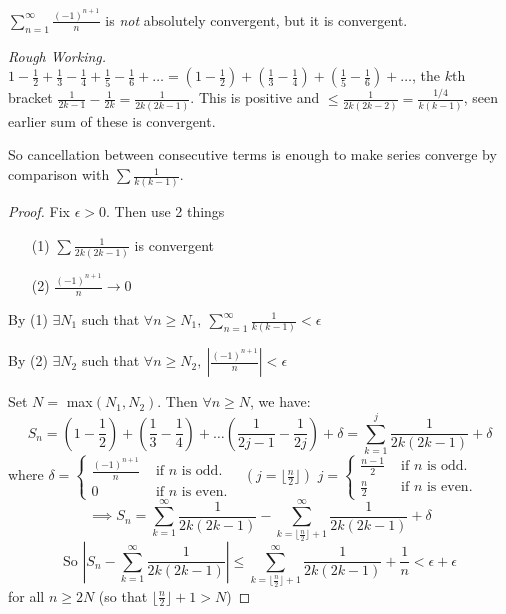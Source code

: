 \begin{example}
$\sum_{n=1}^{\infty} \frac{(-1)^{n+1}}{n}$ is \emph{not} absolutely convergent, but it is convergent.


\textit{Rough Working.} $1 - \frac{1}{2} + \frac{1}{3} - \frac{1}{4} + \frac{1}{5} - \frac{1}{6} + \dots = (1-\frac{1}{2}) + (\frac{1}{3} - \frac{1}{4}) + (\frac{1}{5} -\frac{1}{6}) + \dots$, the $k$th bracket $\frac{1}{2k-1} - \frac{1}{2k} = \frac{1}{2k(2k-1)}$. This is positive and $\leq \frac{1}{2k(2k-2)} = \frac{1/4}{k(k-1)}$, seen earlier sum of these is convergent.

So cancellation between consecutive terms is enough to make series converge by comparison with $\sum \frac{1}{k(k-1)}$.

\begin{proof}
Fix $\epsilon >0.$ Then use 2 things\begin{enumerate}
\item[(1)] $\sum \frac{1}{2k(2k-1)}$	is convergent
\item[(2)] $\frac{(-1)^{n+1}}{n}\to 0$
\end{enumerate}
By (1) $\exists N_1$ such that $\forall n \geq N_1,~ \sum_{n=1}^{\infty} \frac{1}{k(k-1)} < \epsilon$

By (2) $\exists N_2$ such that $\forall n \geq N_2,~ \left|\frac{(-1)^{n+1}}{n}\right| < \epsilon$

Set $N =$ max$(N_1,N_2)$. Then $\forall n \geq N$, we have:
\[S_n = \left(1-\frac{1}{2}\right) + \left(\frac{1}{3} - \frac{1}{4}\right) + \dots \left(\frac{1}{2j-1} - \frac{1}{2j} \right) + \delta = \sum_{k=1}^{j} \frac{1}{2k(2k-1)} + \delta\] 
where $\delta = \begin{cases}
 	\frac{(-1)^{n+1}}{n} & \text{ if } n \text{ is odd.}\\
 	0 & \text{ if } n \text{ is even.}
 \end{cases}
$ $~~\left(j = \lfloor \frac{n}{2} \rfloor\right)$   $j = \begin{cases}
 	\frac{n-1}{2} & \text{ if } n \text{ is odd.}\\
 	\frac{n}{2} & \text{ if } n \text{ is even.}
 \end{cases}
$
\[\implies S_n = \sum_{k=1}^{\infty} \frac{1}{2k(2k-1)} - \sum_{k=\lfloor \frac{n}{2} \rfloor + 1}^{\infty} \frac{1}{2k(2k-1)} + \delta\]
\[\text{So } \left|S_n - \sum_{k=1}^{\infty} \frac{1}{2k(2k-1)} \right| \leq \sum_{k=\lfloor \frac{n}{2} \rfloor + 1}^{\infty} \frac{1}{2k(2k-1)} + \frac{1}{n} < \epsilon + \epsilon\] for all $n \geq 2N$ (so that $\lfloor \frac{n}{2} \rfloor + 1 >N$) 
\end{proof}
\end{example}\vspace*{10pt}


